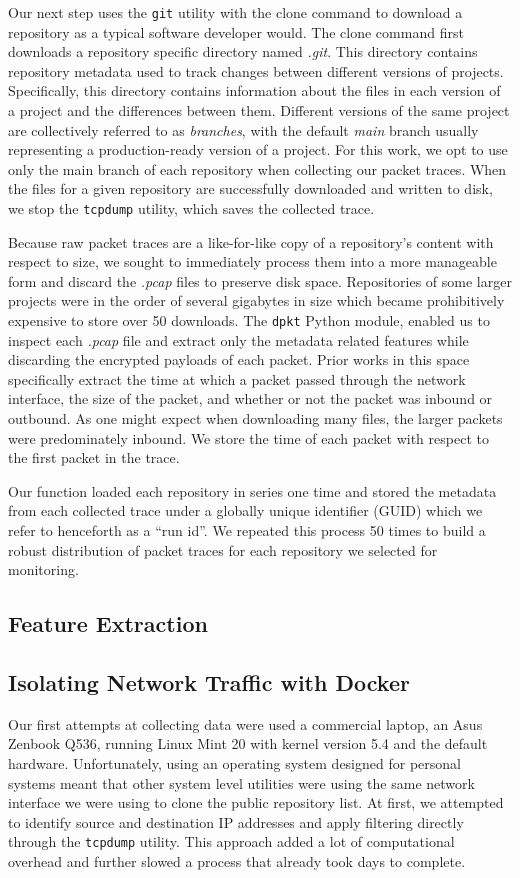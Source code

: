 \documentclass[sigconf,authorversion,nonacm]{acmart}
\begin{document}
Our next step uses the \texttt{git} utility with the clone command to download a repository as a typical software developer would. The clone command first downloads a repository specific directory named \textit{.git}. This directory contains repository metadata used to track changes between different versions of projects. Specifically, this directory contains information about the files in each version of a project and the differences between them. Different versions of the same project are collectively referred to as \textit{branches}, with the default \textit{main} branch usually representing a production-ready version of a project. For this work, we opt to use only the main branch of each repository when collecting our packet traces. When the files for a given repository are successfully downloaded and written to disk, we stop the \texttt{tcpdump} utility, which saves the collected trace.

Because raw packet traces are a like-for-like copy of a repository's content with respect to size, we sought to immediately process them into a more manageable form and discard the \textit{.pcap} files to preserve disk space. Repositories of some larger projects were in the order of several gigabytes in size which became prohibitively expensive to store over 50 downloads. The \texttt{dpkt} Python module, enabled us to inspect each \textit{.pcap} file and extract only the metadata related features while discarding the encrypted payloads of each packet. Prior works in this space specifically extract the time at which a packet passed through the network interface, the size of the packet, and whether or not the packet was inbound or outbound. As one might expect when downloading many files, the larger packets were predominately inbound. We store the time of each packet with respect to the first packet in the trace.

Our function loaded each repository in series one time and stored the metadata from each collected trace under a globally unique identifier (GUID) which we refer to henceforth as a ``run id''. We repeated this process 50 times to build a robust distribution of packet traces for each repository we selected for monitoring. 
\subsection{Feature Extraction}


 
\subsection{Isolating Network Traffic with Docker}
Our first attempts at collecting data were used a commercial laptop, an Asus Zenbook Q536, running Linux Mint 20 with kernel version 5.4 and the default hardware. Unfortunately, using an operating system designed for personal systems meant that other system level utilities were using the same network interface we were using to clone the public repository list. At first, we attempted to identify source and destination IP addresses and apply filtering directly through the \texttt{tcpdump} utility. This approach added a lot of computational overhead and further slowed a process that already took days to complete.
\end{document}
